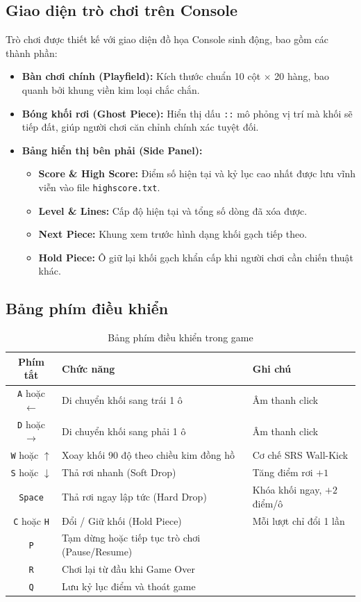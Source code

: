 \documentclass[12pt,a4paper]{article}
\begin{document}
\subsection{Giao diện trò chơi trên Console}
Trò chơi được thiết kế với giao diện đồ họa Console sinh động, bao gồm các thành phần:
\begin{itemize}
    \item \textbf{Bàn chơi chính (Playfield):} Kích thước chuẩn 10 cột $\times$ 20 hàng, bao quanh bởi khung viền kim loại chắc chắn.
    \item \textbf{Bóng khối rơi (Ghost Piece):} Hiển thị dấu \texttt{::} mô phỏng vị trí mà khối sẽ tiếp đất, giúp người chơi căn chỉnh chính xác tuyệt đối.
    \item \textbf{Bảng hiển thị bên phải (Side Panel):}
    \begin{itemize}
        \item \textbf{Score \& High Score:} Điểm số hiện tại và kỷ lục cao nhất được lưu vĩnh viễn vào file \texttt{highscore.txt}.
        \item \textbf{Level \& Lines:} Cấp độ hiện tại và tổng số dòng đã xóa được.
        \item \textbf{Next Piece:} Khung xem trước hình dạng khối gạch tiếp theo.
        \item \textbf{Hold Piece:} Ô giữ lại khối gạch khẩn cấp khi người chơi cần chiến thuật khác.
    \end{itemize}
\end{itemize}

\subsection{Bảng phím điều khiển}
\begin{table}[h!]
\centering
\begin{tabularx}{\textwidth}{cXl}
\toprule
\textbf{Phím tắt} & \textbf{Chức năng} & \textbf{Ghi chú} \\
\midrule
\texttt{A} hoặc $\leftarrow$ & Di chuyển khối sang trái 1 ô & Âm thanh click \\
\texttt{D} hoặc $\rightarrow$ & Di chuyển khối sang phải 1 ô & Âm thanh click \\
\texttt{W} hoặc $\uparrow$ & Xoay khối 90 độ theo chiều kim đồng hồ & Cơ chế SRS Wall-Kick \\
\texttt{S} hoặc $\downarrow$ & Thả rơi nhanh (Soft Drop) & Tăng điểm rơi $+1$ \\
\texttt{Space} & Thả rơi ngay lập tức (Hard Drop) & Khóa khối ngay, $+2$ điểm/ô \\
\texttt{C} hoặc \texttt{H} & Đổi / Giữ khối (Hold Piece) & Mỗi lượt chỉ đổi 1 lần \\
\texttt{P} & Tạm dừng hoặc tiếp tục trò chơi (Pause/Resume) & \\
\texttt{R} & Chơi lại từ đầu khi Game Over & \\
\texttt{Q} & Lưu kỷ lục điểm và thoát game & \\
\bottomrule
\end{tabularx}
\caption{Bảng phím điều khiển trong game}
\end{table}
\end{document}
